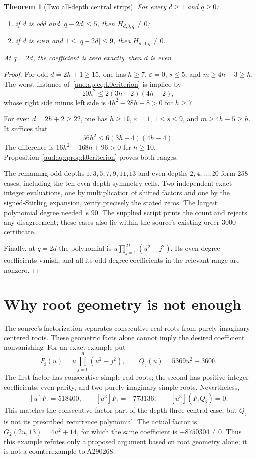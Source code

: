 \documentclass[11pt,a4paper]{article}
\numberwithin{equation}{section}
\newtheorem{theorem}{Theorem}[section]
\begin{document}
\begin{theorem}[Two all-depth central strips]\label{aud:ap:thm:k0strips}
For every $d\ge1$ and $q\ge0$:
\begin{enumerate}
\item if $d$ is odd and $|q-2d|\le5$, then $H_{d,0,q}\ne0$;
\item if $d$ is even and $1\le|q-2d|\le9$, then $H_{d,0,q}\ne0$.
\end{enumerate}
At $q=2d$, the coefficient is zero exactly when $d$ is even.
\end{theorem}
\begin{proof}
For odd $d=2h+1\ge15$, one has $h\ge7$, $\varepsilon=0$, $s\le5$, and $m\ge4h-3\ge h$. The worst instance of~\eqref{aud:ap:eq:k0criterion} is implied by
\[
 20h^2\le2(3h-2)(4h-2),
\]
whose right side minus left side is $4h^2-28h+8>0$ for $h\ge7$.

For even $d=2h+2\ge22$, one has $h\ge10$, $\varepsilon=1$, $1\le s\le9$, and $m\ge4h-5\ge h$. It suffices that
\[
 56h^2\le6(3h-4)(4h-4).
\]
The difference is $16h^2-168h+96>0$ for $h\ge10$. Proposition~\ref{aud:ap:prop:k0criterion} proves both ranges.

The remaining odd depths $1,3,5,7,9,11,13$ and even depths $2,4,\ldots,20$ form 258 cases, including the ten even-depth symmetry cells. Two independent exact-integer evaluations, one by multiplication of shifted factors and one by the signed-Stirling expansion, verify precisely the stated zeros. The largest polynomial degree needed is $90$. The supplied script prints the count and rejects any disagreement; these cases also lie within the source's existing order-$3000$ certificate.

Finally, at $q=2d$ the polynomial is $u\prod_{j=1}^{2d}(u^2-j^2)$. Its even-degree coefficients vanish, and all its odd-degree coefficients in the relevant range are nonzero.
\end{proof}
\section{Why root geometry is not enough}\label{aud:sec:rootgeom}
The source's factorization separates consecutive real roots from purely imaginary centered roots. These geometric facts alone cannot imply the desired coefficient nonvanishing. For an exact example put
\[
 F_\sharp(u)=u\prod_{j=1}^{6}(u^2-j^2),\qquad Q_\sharp(u)=5369u^2+3600.
\]
The first factor has consecutive simple real roots; the second has positive integer coefficients, even parity, and two purely imaginary simple roots. Nevertheless,
\[
 [u]F_\sharp=518400,\qquad [u^3]F_\sharp=-773136,\qquad [u^3](F_\sharp Q_\sharp)=0.
\]
This matches the consecutive-factor part of the depth-three central case, but $Q_\sharp$ is not its prescribed recurrence polynomial. The actual factor is $G_2(2u,13)=4u^2+14$, for which the same coefficient is $-8750304\ne0$. Thus this example refutes only a proposed argument based on root geometry alone; it is not a counterexample to A290268.
\end{document}
